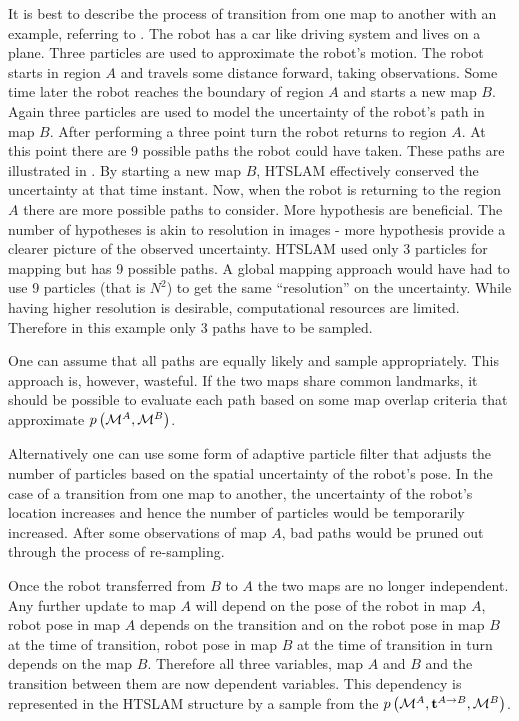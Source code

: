 It is best to describe the process of transition from one map to
another with an example, referring to
. The robot has a car like driving
system and lives on a plane. Three particles are used to approximate
the robot's motion. The robot starts in region $A$ and travels some
distance forward, taking observations. Some time later the robot
reaches the boundary of region $A$ and starts a new map $B$. Again
three particles are used to model the uncertainty of the robot's path
in map $B$. After performing a three point turn the robot returns to
region $A$. At this point there are 9 possible paths the robot could
have taken. These paths are illustrated in
. By starting a new map $B$, HTSLAM
effectively conserved the uncertainty at that time instant. Now, when
the robot is returning to the region $A$ there are more possible paths
to consider. More hypothesis are beneficial. The number of hypotheses
is akin to resolution in images - more hypothesis provide a clearer
picture of the observed uncertainty. HTSLAM used only 3 particles for
mapping but has 9 possible paths. A global mapping approach would have
had to use 9 particles (that is $N^2$) to get the same ``resolution''
on the uncertainty. While having higher resolution is desirable,
computational resources are limited. Therefore in this example only 3
paths have to be sampled.

One can assume that all paths are equally likely and sample
appropriately. This approach is, however, wasteful. If the two maps
share common landmarks, it should be possible to evaluate each path
based on some map overlap criteria that approximate
$\prob{\mapA,\mapB}$.

Alternatively one can use some form of adaptive particle filter
\cite{KLDSampling} that adjusts the number of particles
based on the spatial uncertainty of the robot's pose. In the case of a
transition from one map to another, the uncertainty of the robot's
location increases and hence the number of particles would be
temporarily increased. After some observations of map $A$, bad paths
would be pruned out through the process of re-sampling. 


Once the robot transferred from $B$ to $A$ the two maps are no longer
independent. Any further update to map $A$ will depend on the pose of
the robot in map $A$, robot pose in map $A$ depends on the transition
and on the robot pose in map $B$ at the time of transition, robot pose
in map $B$ at the time of transition in turn depends on the map
$B$. Therefore all three variables, map $A$ and $B$ and the transition
between them are now dependent variables. This dependency is
represented in the HTSLAM structure by a sample from the
$\prob{\mapA,\tr{}{A}{B},\mapB}$.

